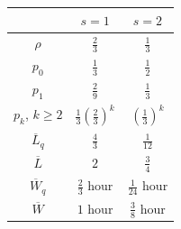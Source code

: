 \begin{table}[H]
    \centering
    \begin{tabular}{|c|c|c|}
        \hline
         & $s=1$ & $s=2$ \\
         \hline
        $\rho$ & $\frac{2}{3}$ & $\frac{1}{3}$ \\
        $p_0$ &  $\frac{1}{3}$ & $\frac{1}{2}$ \\
        $p_1$ &  $\frac{2}{9}$ & $\frac{1}{3}$ \\
        $p_k$, $k\geqslant 2$ & $\frac{1}{3}\left(\frac{2}{3}\right)^k$ & $\left(\frac{1}{3}\right)^k$\\
        $\overline{L}_q$ & $\frac{4}{3}$ & $\frac{1}{12}$\\
        $\overline{L}$ & $2$ & $\frac{3}{4}$ \\
        $\overline{W}_q$ & $\frac{2}{3}$ hour & $\frac{1}{24}$ hour\\
        $\overline{W}$ & $1$ hour & $\frac{3}{8}$ hour \\
         \hline
    \end{tabular}
\end{table}

